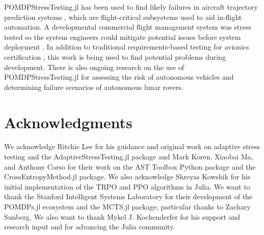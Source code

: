 POMDPStressTesting.jl has been used to find likely failures in aircraft trajectory prediction systems \cite{ast_fms}, which are flight-critical subsystems used to aid in-flight automation.
A developmental commercial flight management system was stress tested so the system engineers could mitigate potential issues before system deployment \cite{ast_fms}.
In addition to traditional requirements-based testing for avionics certification \cite{do178c}, this work is being used to find potential problems during development.
There is also ongoing research on the use of POMDPStressTesting.jl for assessing the risk of autonomous vehicles and determining failure scenarios of autonomous lunar rovers. 


\section{Acknowledgments}

We acknowledge Ritchie Lee for his guidance and original work on adaptive stress testing and the AdaptiveStressTesting.jl package and Mark Koren, Xiaobai Ma, and Anthony Corso for their work on the AST Toolbox Python package and the CrossEntropyMethod.jl package.
We also acknowledge Shreyas Kowshik for his initial implementation of the TRPO and PPO algorithms in Julia.
We want to thank the Stanford Intelligent Systems Laboratory for their development of the POMDPs.jl ecosystem and the MCTS.jl package; particular thanks to Zachary Sunberg.
We also want to thank Mykel J. Kochenderfer for his support and research input and for advancing the Julia community.
